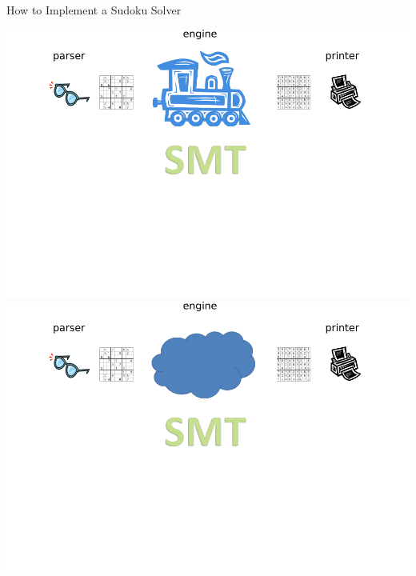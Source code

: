 \documentclass{beamer}
\begin{document}
\begin{frame}{How to Implement a Sudoku Solver}
\begin{overprint}
 \includegraphics[width=\textwidth]{current7}
 \includegraphics[width=\textwidth]{current8}
\end{overprint}
\end{frame}
 
\end{document}
